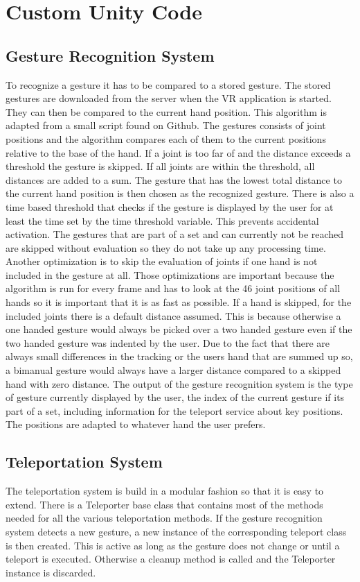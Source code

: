 \chapter{Custom Unity Code}

\section{Gesture Recognition System}
To recognize a gesture it has to be compared to a stored gesture. The stored gestures are downloaded from the server when the VR application is started. They can then be compared to the current hand position. This algorithm is adapted from a small script found on Github.  %
The gestures consists of joint positions and the algorithm compares each of them to the current positions relative to the base of the hand. If a joint is too far of and the distance exceeds a threshold the gesture is skipped. If all joints are within the threshold, all distances are added to a sum. The gesture that has the lowest total distance to the current hand position is then chosen as the recognized gesture. There is also a time based threshold that checks if the gesture is displayed by the user for at least the time set by the time threshold variable. This prevents accidental activation. The gestures that are part of a set and can currently not be reached are skipped without evaluation so they do not take up any processing time. Another optimization is to skip the evaluation of joints if one hand is not included in the gesture at all. Those optimizations are important because the algorithm is run for every frame and has to look at the 46 joint positions of all hands so it is important that it is as fast as possible.
If a hand is skipped, for the included joints there is a default distance assumed. This is because otherwise a one handed gesture would always be picked over a two handed gesture even if the two handed gesture was indented by the user. Due to the fact that there are always small differences in the tracking or the users hand that are summed up so, a bimanual gesture would always have a larger distance compared to a skipped hand with zero distance. 
The output of the gesture recognition system is the type of gesture currently displayed by the user, the index of the current gesture if its part of a set, including information for the teleport service about key positions. The positions are adapted to whatever hand the user prefers.

\section{Teleportation System}
The teleportation system is build in a modular fashion so that it is easy to extend. There is a Teleporter base class that contains most of the methods needed for all the various teleportation methods. If the gesture recognition system detects a new gesture, a new instance of the corresponding teleport class is then created. This is active as long as the gesture does not change or until a teleport is executed. Otherwise a cleanup method is called and the Teleporter instance is discarded. 

